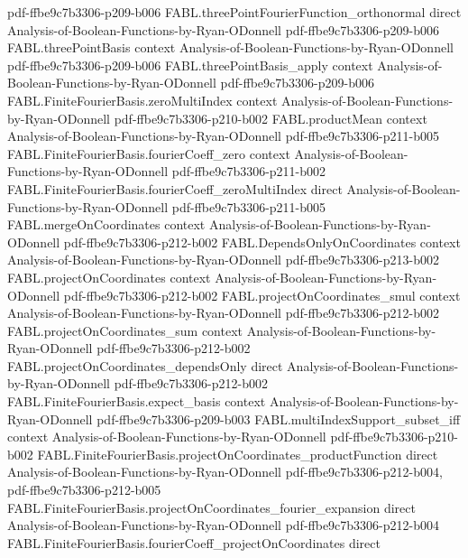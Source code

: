 \begin{theorem}
  {pdf-ffbe9c7b3306-p209-b006}
\proofstep
  {FABL.threePointFourierFunction_orthonormal}
  {direct}
  {Analysis-of-Boolean-Functions-by-Ryan-ODonnell}
  {pdf-ffbe9c7b3306-p209-b006}
\proofstep
  {FABL.threePointBasis}
  {context}
  {Analysis-of-Boolean-Functions-by-Ryan-ODonnell}
  {pdf-ffbe9c7b3306-p209-b006}
\proofstep
  {FABL.threePointBasis_apply}
  {context}
  {Analysis-of-Boolean-Functions-by-Ryan-ODonnell}
  {pdf-ffbe9c7b3306-p209-b006}
\proofstep
  {FABL.FiniteFourierBasis.zeroMultiIndex}
  {context}
  {Analysis-of-Boolean-Functions-by-Ryan-ODonnell}
  {pdf-ffbe9c7b3306-p210-b002}
\proofstep
  {FABL.productMean}
  {context}
  {Analysis-of-Boolean-Functions-by-Ryan-ODonnell}
  {pdf-ffbe9c7b3306-p211-b005}
\proofstep
  {FABL.FiniteFourierBasis.fourierCoeff_zero}
  {context}
  {Analysis-of-Boolean-Functions-by-Ryan-ODonnell}
  {pdf-ffbe9c7b3306-p211-b002}
\proofstep
  {FABL.FiniteFourierBasis.fourierCoeff_zeroMultiIndex}
  {direct}
  {Analysis-of-Boolean-Functions-by-Ryan-ODonnell}
  {pdf-ffbe9c7b3306-p211-b005}
\proofstep
  {FABL.mergeOnCoordinates}
  {context}
  {Analysis-of-Boolean-Functions-by-Ryan-ODonnell}
  {pdf-ffbe9c7b3306-p212-b002}
\proofstep
  {FABL.DependsOnlyOnCoordinates}
  {context}
  {Analysis-of-Boolean-Functions-by-Ryan-ODonnell}
  {pdf-ffbe9c7b3306-p213-b002}
\proofstep
  {FABL.projectOnCoordinates}
  {context}
  {Analysis-of-Boolean-Functions-by-Ryan-ODonnell}
  {pdf-ffbe9c7b3306-p212-b002}
\proofstep
  {FABL.projectOnCoordinates_smul}
  {context}
  {Analysis-of-Boolean-Functions-by-Ryan-ODonnell}
  {pdf-ffbe9c7b3306-p212-b002}
\proofstep
  {FABL.projectOnCoordinates_sum}
  {context}
  {Analysis-of-Boolean-Functions-by-Ryan-ODonnell}
  {pdf-ffbe9c7b3306-p212-b002}
\proofstep
  {FABL.projectOnCoordinates_dependsOnly}
  {direct}
  {Analysis-of-Boolean-Functions-by-Ryan-ODonnell}
  {pdf-ffbe9c7b3306-p212-b002}
\proofstep
  {FABL.FiniteFourierBasis.expect_basis}
  {context}
  {Analysis-of-Boolean-Functions-by-Ryan-ODonnell}
  {pdf-ffbe9c7b3306-p209-b003}
\proofstep
  {FABL.multiIndexSupport_subset_iff}
  {context}
  {Analysis-of-Boolean-Functions-by-Ryan-ODonnell}
  {pdf-ffbe9c7b3306-p210-b002}
\proofstep
  {FABL.FiniteFourierBasis.projectOnCoordinates_productFunction}
  {direct}
  {Analysis-of-Boolean-Functions-by-Ryan-ODonnell}
  {pdf-ffbe9c7b3306-p212-b004,
    pdf-ffbe9c7b3306-p212-b005}
\proofstep
  {FABL.FiniteFourierBasis.projectOnCoordinates_fourier_expansion}
  {direct}
  {Analysis-of-Boolean-Functions-by-Ryan-ODonnell}
  {pdf-ffbe9c7b3306-p212-b004}
\proofstep
  {FABL.FiniteFourierBasis.fourierCoeff_projectOnCoordinates}
  {direct}

\end{theorem}
